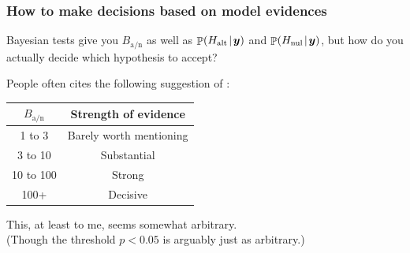 \documentclass[18pt]{beamer}
\newcommand{\given}{\mskip.7\thinmuskip | \mskip.7\thinmuskip}
\DeclareMathOperator{\probability}{\mathbb{P}}
\newcommand{\by}{\bm{y}}
\newcommand{\hypothesis}{H}
\newcommand{\nullSub}{\mathrm{nul}}
\newcommand{\altSub}{\mathrm{alt}}
\newcommand{\bayesFacAlt}{B_{\mathrm{a} / \mathrm{n}}}
\begin{document}
\begin{frame}
\begin{minipage}{.32\linewidth}
\begin{figure}
	\end{figure}
\end{minipage}
\end{frame}


\begin{frame}
\frametitle{How to make decisions based on model evidences}
Bayesian tests give you $\bayesFacAlt$ as well as $\probability(\hypothesis_\altSub \given \by)$ and $\probability(\hypothesis_\nullSub \given \by)$,
but how do you actually decide which hypothesis to accept?

\pause
\smallskip
People often cites the following suggestion of \cite{jeffreys1961theory_of_probability}:
\vspace*{-.5\baselineskip}
\begin{center}
\begin{tabular}{c|c} 
$\bayesFacAlt$ & Strength of evidence \\ [0.5ex] 
 \hline\hline
1 to 3 & Barely worth mentioning \\ 
 \hline
3 to 10 & Substantial \\
 \hline
10 to 100 & Strong \\
 \hline
 100+ & Decisive 
\end{tabular}
\end{center}
\pause
This, at least to me, seems somewhat arbitrary.\\ 
(Though the threshold $p < 0.05$ is arguably just as arbitrary.)
\end{frame}
\end{document}
